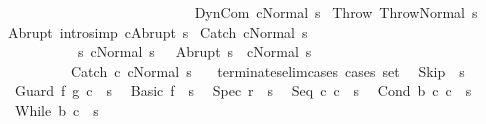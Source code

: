 \begin{isabellebody}
\ \ \ \ \ \ \ \ \ \ \ \ \ {\isasymLongrightarrow}\ \isanewline
\ \ \ \ \ \ \ \ \ \ \ \ \ {\isasymGamma}{\isasymturnstile}DynCom\ c{\isasymdown}{\isacharparenleft}Normal\ s{\isacharparenright}{\isachardoublequoteclose}\isanewline
\isanewline
{\isacharbar}\ Throw{\isacharcolon}\ {\isachardoublequoteopen}{\isasymGamma}{\isasymturnstile}Throw{\isasymdown}{\isacharparenleft}Normal\ s{\isacharparenright}{\isachardoublequoteclose}\isanewline
\isanewline
{\isacharbar}\ Abrupt\ {\isacharbrackleft}intro{\isacharcomma}simp{\isacharbrackright}{\isacharcolon}\ {\isachardoublequoteopen}{\isasymGamma}{\isasymturnstile}c{\isasymdown}Abrupt\ s{\isachardoublequoteclose}\isanewline
\isanewline
{\isacharbar}\ Catch{\isacharcolon}\ {\isachardoublequoteopen}{\isasymlbrakk}{\isasymGamma}{\isasymturnstile}cNormal\ s{\isacharsemicolon}\ \isanewline
\ \ \ \ \ \ \ \ \ \ \ {\isasymforall}s{\isacharprime}{\isachardot}\ {\isasymGamma}{\isasymturnstile}{\isasymlangle}cNormal\ s\ {\isasymrangle}\ {\isasymRightarrow}\ Abrupt\ s{\isacharprime}\ {\isasymlongrightarrow}\ {\isasymGamma}{\isasymturnstile}cNormal\ s{\isacharprime}{\isasymrbrakk}\isanewline
\ \ \ \ \ \ \ \ \ \ {\isasymLongrightarrow}\isanewline
\ \ \ \ \ \ \ \ \ \ {\isasymGamma}{\isasymturnstile}Catch\ c\ cNormal\ s{\isachardoublequoteclose}\ \ \isanewline
\isanewline
\isanewline
{}\isamarkupfalse%
\ terminates{\isacharunderscore}elim{\isacharunderscore}cases\ {\isacharbrackleft}cases\ set{\isacharbrackright}{\isacharcolon}\isanewline
\ \ {\isachardoublequoteopen}{\isasymGamma}{\isasymturnstile}Skip\ {\isasymdown}\ s{\isachardoublequoteclose}\isanewline
\ \ {\isachardoublequoteopen}{\isasymGamma}{\isasymturnstile}Guard\ f\ g\ c\ {\isasymdown}\ s{\isachardoublequoteclose}\isanewline
\ \ {\isachardoublequoteopen}{\isasymGamma}{\isasymturnstile}Basic\ f\ {\isasymdown}\ s{\isachardoublequoteclose}\isanewline
\ \ {\isachardoublequoteopen}{\isasymGamma}{\isasymturnstile}Spec\ r\ {\isasymdown}\ s{\isachardoublequoteclose}\isanewline
\ \ {\isachardoublequoteopen}{\isasymGamma}{\isasymturnstile}Seq\ c{}\ c{}\ {\isasymdown}\ s{\isachardoublequoteclose}\isanewline
\ \ {\isachardoublequoteopen}{\isasymGamma}{\isasymturnstile}Cond\ b\ c{}\ c{}\ {\isasymdown}\ s{\isachardoublequoteclose}\isanewline
\ \ {\isachardoublequoteopen}{\isasymGamma}{\isasymturnstile}While\ b\ c\ {\isasymdown}\ s{\isachardoublequoteclose}\isanewline

\end{isabellebody}
